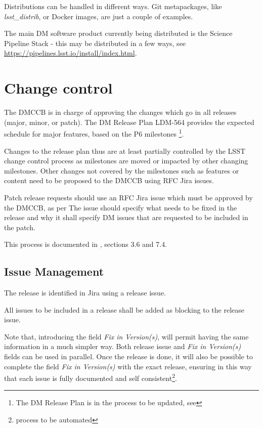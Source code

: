 Distributions can be handled in different ways.
Git metapackages, like \textit{lsst\_distrib}, or Docker images, are just a couple of examples.

The main DM software product currently being distributed is the Science Pipeline Stack -
this may be distributed in a few ways, see \url{https://pipelines.lsst.io/install/index.html}.


\newpage
\section{Change control} \label{sec:changecontrol}

The DMCCB is in charge of approving the changes which go in all releases (major, minor, or patch).
The DM Release Plan LDM-564 provides the expected schedule for major features, based on the P6 milestones \footnote{The DM Release Plan is in the process to be updated, see }.

Changes to the release plan thus are at least partially controlled by the LSST change control process as milestones are moved or impacted by other changing milestones. 
Other changes not covered by the milestones such as features or content need to be proposed to the DMCCB using RFC Jira issues.

Patch release requests should use an RFC Jira issue which must be approved by the DMCCB, as per 
The issue should specify what needs to be fixed in the release and why it shall specify DM issues that are requested to be included in the patch.

This process is documented in , sections 3.6 and 7.4.


\subsection{Issue Management} \label{sec:issues}

The release is identified in Jira using a release issue.

All issues to be included in a release shall be added as blocking to the release issue.

Note that, introducing the field \textit{Fix in Version(s)}, will permit having the same information in a much simpler way.
Both release issue and \textit{Fix in Version(s)} fields can be used in parallel.
Once the release is done, it will also be possible to complete the field \textit{Fix in Version(s)} with the exact release,
ensuring in this way that each issue is fully documented and self consistent\footnote{process to be automated}.


